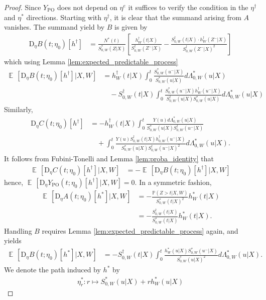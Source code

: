 \documentclass{article}
\DeclareMathOperator{\EX}{\mathbb{E}\,}
\newcommand{\YPO}{Y_{\mathrm{PO}}}
\newcommand{\bD}{\mathrm{D}}
\newcommand{\mbb}{\mathbb}
\begin{document}
\begin{proof}
Since $\YPO$ does not depend on $\eta^e$ it suffices to verify the condition in the $\eta^\dagger$ and $\eta^*$ directions. Starting with $\eta^\dagger$, 
it is clear that the summand arising from $A$ vanishes. The summand yield by $B$ is given by
\begin{align*}
\bD_\eta  B(t;\eta_0) [h^\dagger] &= \frac{N^*(t)}{S_{0,W}^*(Z|X)} 
\left[ \frac{h_W^\dagger(t|X)}{S_{0,W}^\dagger(Z^-|X)} 
- \frac{S_{0,W}^\dagger(t|X) \cdot h_W^\dagger(Z^-|X)}{S_{0,W}^\dagger(Z^-|X)^2} \right]
\end{align*}
which using Lemma \ref{lem:expected_predictable_process}
\begin{align*}
\EX[\bD_\eta  B(t;\eta_0) [h^\dagger]|X,W] &= h_W^\dagger(t|X) \int_0^t \frac{S_{0,W}^*(u^-|X)}{S_{0,W}^*(u|X)} d \Lambda_{0,W}^*(u|X) \\ 
& \quad - S_{0,W}^\dagger(t|X) \int_0^t \frac{S_{0,W}^*(u^-|X)h_W^\dagger(u^-|X)}{S_{0,W}^\dagger(u|X)S_{0,W}^*(u|X)} d \Lambda_{0,W}^*(u|X)  
\end{align*}
Similarly,
\begin{align*}
\bD_\eta  C(t;\eta_0) [h^\dagger] &= 
- h_W^\dagger(t|X) \int_{0}^{t} \frac{Y(u) d\Lambda^*_{0,W}(u|X)}{S_{0,W}^*(u|X) S_{0,W}^\dagger(u^-|X)}  \\
& \quad + \int_{0}^{t} \frac{Y(u) S_{0,W}^\dagger(t|X)h_{0,W}^\dagger(u^-|X)}{S_{0,W}^*(u|X) S_{0,W}^\dagger(u^-|X)^2} d\Lambda^*_{0,W}(u|X).
\end{align*}
It follows from Fubini-Tonelli and Lemma \ref{lem:proba_identity} that
\begin{align*}
\EX[\bD_\eta  C(t;\eta_0) [h^\dagger]|X,W] &= - \EX[\bD_\eta  B(t;\eta_0) [h^\dagger]|X,W]
\end{align*}
hence, $\EX[ \bD_\eta  \YPO (t;\eta_0) [h^\dagger] | X,W] = 0$. In a symmetric fashion,
\begin{align*}
\EX [ \bD_\eta  A(t;\eta_0) [h^*] | X,W ] &= 
- \frac{\mbb{P}(Z > t| X,W)}{S_{0,W}^*(t|X)^2} h_W^*(t|X) \\
&= - \frac{S_{0,W}^\dagger(t|X)}{S_{0,W}^*(t|X)} h_W^*(t|X).
\end{align*}
Handling $B$ requires Lemma \ref{lem:expected_predictable_process} again, and yields
\begin{align*}
\EX[\bD_\eta  B(t;\eta_0) [h^*]|X,W] &= - S_{0,W}^\dagger(t|X) \int_0^t \frac{h_W^*(u|X) S_{0,W}^*(u^-|X)}{S_{0,W}^*(u|X)^2} d\Lambda^*_{0,W}(u|X).
\end{align*}
We denote the path induced by $h^*$ by 
\begin{align*}\eta_r^*: r \mapsto S_{0,W}^\ast(u|X)+r h^*_W(u|X)

\end{align*}
\end{proof}
\end{document}

